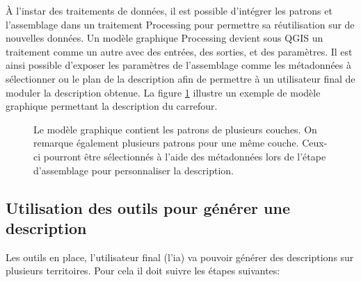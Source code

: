 \newpar{}

À l'instar des traitements de données, il est possible d'intégrer les patrons et l'assemblage dans un traitement Processing pour permettre sa réutilisation sur de nouvelles données. Un modèle graphique Processing devient sous QGIS un traitement comme un autre avec des entrées, des sorties, et des paramètres. Il est ainsi possible d'exposer les paramètres de l'assemblage comme les métadonnées à sélectionner ou le plan de la description afin de permettre à un utilisateur final de moduler la description obtenue. La figure \ref{fig:experimentation_qgis2desc_modele_assemblage} illustre un exemple de modèle graphique permettant la description du carrefour.

\begin{figure}[ht]
    \centering
    \caption{Le modèle graphique contient les patrons de plusieurs couches. On remarque également plusieurs patrons pour une même couche. Ceux-ci pourront être sélectionnés à l'aide des métadonnées lors de l'étape d'assemblage pour personnaliser la description.}
    \label{fig:experimentation_qgis2desc_modele_assemblage}
\end{figure}

\subsection{Utilisation des outils pour générer une description}

Les outils en place, l'utilisateur final (l'\gls{ia}) va pouvoir générer des descriptions sur plusieurs territoires. Pour cela il doit suivre les étapes suivantes:

